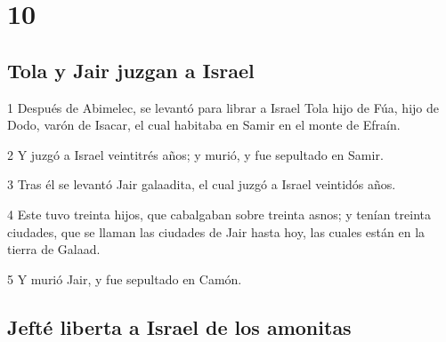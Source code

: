 \chapter{10}

\section*{Tola y Jair juzgan a Israel}

\par 1 Después de Abimelec, se levantó para librar a Israel Tola hijo de Fúa, hijo de Dodo, varón de Isacar, el cual habitaba en Samir en el monte de Efraín. 
\par 2 Y juzgó a Israel veintitrés años; y murió, y fue sepultado en Samir.
\par 3 Tras él se levantó Jair galaadita, el cual juzgó a Israel veintidós años.
\par 4 Este tuvo treinta hijos, que cabalgaban sobre treinta asnos; y tenían treinta ciudades, que se llaman las ciudades de Jair hasta hoy, las cuales están en la tierra de Galaad.
\par 5 Y murió Jair, y fue sepultado en Camón.

\section*{Jefté liberta a Israel de los amonitas}

